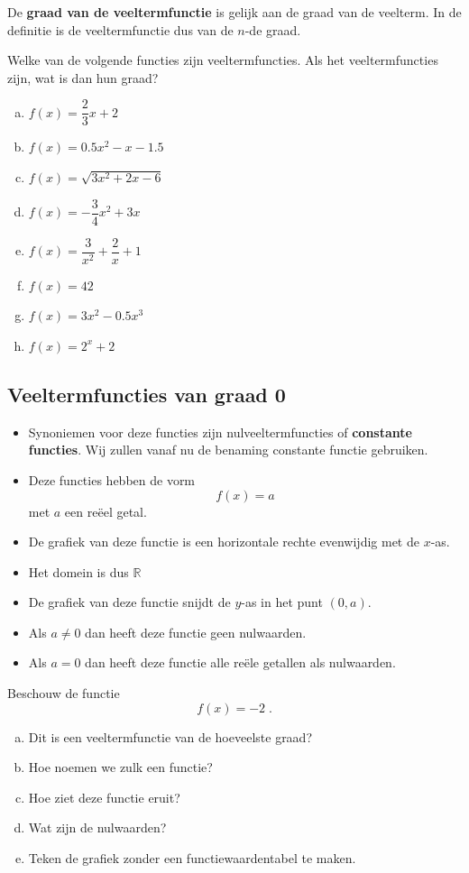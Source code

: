 \documentclass[12pt]{article}
\begin{document}
De {\bf graad van de veeltermfunctie} is gelijk aan de graad van de veelterm. In de definitie is de veeltermfunctie dus van de $n$-de graad.

\begin{oefening}
  Welke van de volgende functies zijn veeltermfuncties. Als het veeltermfuncties zijn, wat is dan hun graad?
  \begin{enumerate}[(a)]
    \itemsep1em
  \item $f(x)=\dfrac{2}{3}x+2$
  \item $f(x)=0.5x^2-x-1.5$
  \item $f(x)=\sqrt{3x^2+2x-6}$
  \item $f(x)=-\dfrac{3}{4}x^2+3x$
  \item $f(x)=\dfrac{3}{x^2}+\dfrac{2}{x}+1$
  \item $f(x)=42$
  \item $f(x)=3x^2-0.5x^3$
  \item $f(x)=2^x+2$
  \end{enumerate}
\end{oefening}

\pagebreak
\subsection{Veeltermfuncties van graad 0}

\begin{itemize}
\item Synoniemen voor deze functies zijn nulveeltermfuncties of {\bf constante functies}. Wij zullen vanaf nu de benaming constante functie gebruiken.
\item Deze functies hebben de vorm
  $$f(x) = a$$
  met $a$ een reëel getal.
\item De grafiek van deze functie is een horizontale rechte evenwijdig met de $x$-as.
\item Het domein is dus $\mathbb{R}$
\item De grafiek van deze functie snijdt de $y$-as in het punt $(0, a)$.
\item Als $a\neq 0$ dan heeft deze functie geen nulwaarden.
\item Als $a=0$ dan heeft deze functie alle reële getallen als nulwaarden.
\end{itemize}

\begin{oefening}
  Beschouw de functie
  $$f(x)=-2\;.$$
  \begin{enumerate}[(a)]
  \item Dit is een veeltermfunctie van de hoeveelste graad?
  \item Hoe noemen we zulk een functie?
  \item Hoe ziet deze functie eruit?
  \item Wat zijn de nulwaarden?
  \item Teken de grafiek zonder een functiewaardentabel te maken.
  \end{enumerate}
\end{oefening}
\end{document}
